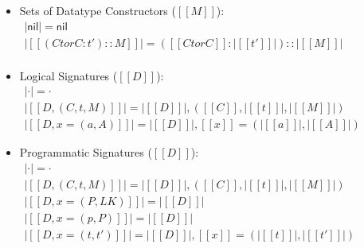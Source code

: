 \begin{definition}
\begin{itemize}
  \item Sets of Datatype Constructors ($[[M]]$):\\
    \begin{math}
      \begin{array}{lll}
        |\mathsf{nil}| = \mathsf{nil}\\
        |[[(Ctor C : t') :: M]]| = ([[Ctor C]] : |[[t']]|)::|[[M]]| \\
      \end{array}
    \end{math}
    
  \item Logical Signatures ($[[D]]$):\\
    \begin{math}
      \begin{array}{lll}
        |\cdot| = \cdot\\
        |[[D , ( C , t , M )]]| = |[[D]]|, ([[C]], |[[t]]|, |[[M]]|)\\
        |[[D , x = ( a , A )]]| = |[[D]]| , [[x]] = ( |[[a]]| , |[[A]]| )
      \end{array}
    \end{math}

  \item Programmatic Signatures ($[[D]]$):\\
    \begin{math}
      \begin{array}{lll}
        |\cdot| = \cdot\\
        |[[D , ( C , t , M )]]| = |[[D]]|, ([[C]], |[[t]]|, |[[M]]|)\\
        |[[D , x = ( P , LK )]]| = |[[D]]|\\
        |[[D , x = ( p , P )]]| = |[[D]]|\\
        |[[D , x = ( t , t' )]]| = |[[D]]| , [[x]] = ( |[[t]]| , |[[t']]| )
      \end{array}
    \end{math}
  \end{itemize}
\end{definition}

